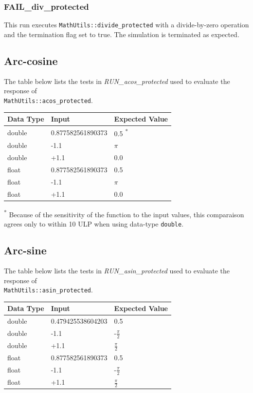 \documentclass[11pt,fleqn]{report}
\begin{document}
\clearpage


\subsubsection{FAIL\_div\_protected}
This run executes \texttt{MathUtils::divide\_protected} with a divide-by-zero
operation and the termination flag set to true. The simulation is terminated as
expected.


\subsection{Arc-cosine}
The table below lists the tests in \textit{RUN\_acos\_protected} used to evaluate the response of \\
\texttt{MathUtils::acos\_protected}.
\begin{center}
\begin{tabular}{|l||l|l|}
\hline
 \textbf{Data Type} & \textbf{Input} & \textbf{Expected Value} \\
\hline \hline
double &0.877582561890373 & 0.5 \textsuperscript{*} \\
double & -1.1 & $\pi$ \\
double & +1.1 & 0.0 \\
\hline
float&0.877582561890373 & 0.5 \\
float& -1.1 & $\pi$ \\
float& +1.1 & 0.0 \\
\hline \hline
\end{tabular}
\end{center}
\textsuperscript{*} Because of the sensitivity of the function to the input
values, this comparaison agrees only to within 10 ULP when using data-type
\texttt{double}.


\subsection{Arc-sine}
The table below lists the tests in \textit{RUN\_asin\_protected} used to evaluate the response of \\
\texttt{MathUtils::asin\_protected}.
\begin{center}
\begin{tabular}{|l||l|l|}
\hline
 \textbf{Data Type} & \textbf{Input} & \textbf{Expected Value} \\
\hline \hline
double &0.479425538604203 & 0.5 \\
double & -1.1 & -$\frac{\pi}{2}$ \\
double & +1.1 &$\frac{\pi}{2}$ \\
\hline
float&0.877582561890373 & 0.5 \\
float& -1.1 & -$\frac{\pi}{2}$ \\
float& +1.1 &$\frac{\pi}{2}$ \\
\hline \hline
\end{tabular}
\end{center}
\end{document}
